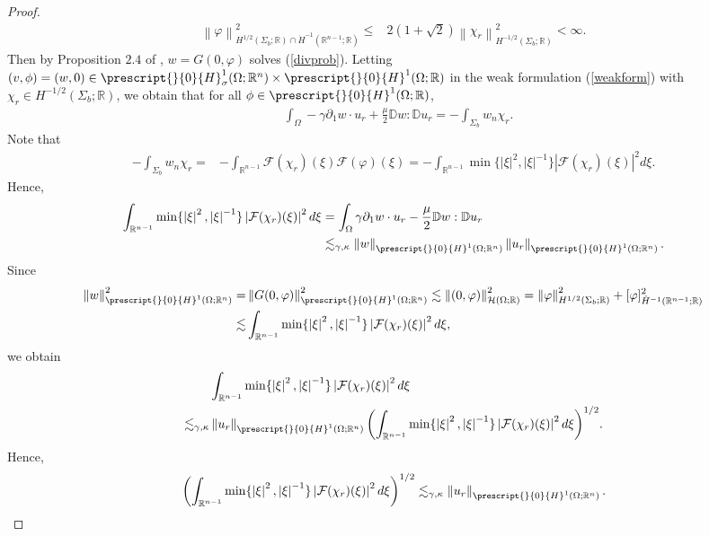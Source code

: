 \documentclass[11pt,letterpaper,reqno]{amsart}
\numberwithin{equation}{section}
\newcommand{\abs}[1]{\left\lvert#1\right\rvert}
\newcommand{\norm}[1]{\left\lVert#1\right\rVert}
\begin{document}
\begin{proof}
    \begin{align}
        \norm{\varphi}_{H^{1/2}(\Sigma_{b};\mathbb{R}) \cap \dot{H}^{-1}(\mathbb{R}^{n-1};\mathbb{R})}^{2} \leq& 2(1+\sqrt{2})\norm{\chi_{r}}_{H^{-1/2}(\Sigma_{b};\mathbb{R})}^{2}<\infty.
    \end{align}
    Then by Proposition \(2.4\) of \cite{MR4337506}, \(w=G(0,\varphi)\) solves (\ref{divprob}). Letting \((v,\phi)=(w,0) \in \prescript{}{0}{H}^{1}_{\sigma}(\Omega;\mathbb{R}^{n}) \times \prescript{}{0}{H}^{1}(\Omega;\mathbb{R})\) in the weak formulation (\ref{weakform}) with \(\chi_{r} \in H^{-1/2}(\Sigma_{b};\mathbb{R})\), we obtain that for all \(\phi \in \prescript{}{0}{H}^{1}(\Omega;\mathbb{R})\),
    \begin{align} \label{weakform2}
        &\int_{\Omega}-\gamma\partial_{1}w\cdot u_{r} +\frac{\mu}{2}\mathbb{D}w:\mathbb{D}u_{r} =-\int_{\Sigma_{b}}w_{n}\chi_{r}.
    \end{align}
    Note that
    \begin{align}
        -\int_{\Sigma_{b}}w_{n}\chi_{r} =& -\int_{\mathbb{R}^{n-1}}\mathcal{F}(\chi_{r})(\xi)\mathcal{F}(\varphi)(\xi) =-\int_{\mathbb{R}^{n-1}}\min\{\abs{\xi}^{2},\abs{\xi}^{-1}\}\abs{\mathcal{F}(\chi_{r})(\xi)}^{2}d\xi.
    \end{align}
    Hence,
    \begin{align}
        \int_{\mathbb{R}^{n-1}}\min\{\abs{\xi}^{2},\abs{\xi}^{-1}\}\abs{\mathcal{F}(\chi_{r})(\xi)}^{2}d\xi &=\int_{\Omega}\gamma\partial_{1}w\cdot u_{r} -\frac{\mu}{2}\mathbb{D}w:\mathbb{D}u_{r} \nonumber \\
        &\lesssim_{\gamma,\kappa} \norm{w}_{\prescript{}{0}{H}^{1}(\Omega;\mathbb{R}^{n})}\norm{u_{r}}_{\prescript{}{0}{H}^{1}(\Omega;\mathbb{R}^{n})}.
    \end{align}
    Since
    \begin{align}
        \norm{w}_{\prescript{}{0}{H}^{1}(\Omega;\mathbb{R}^{n})}^{2}=&\norm{G(0,\varphi)}_{\prescript{}{0}{H}^{1}(\Omega;\mathbb{R}^{n})}^{2} \lesssim \norm{(0,\varphi)}_{\mathcal{H}(\Omega;\mathbb{R})}^{2} =\norm{\varphi}_{H^{1/2}(\Sigma_{b};\mathbb{R})}^{2}+[\varphi]_{\dot{H}^{-1}(\mathbb{R}^{n-1};\mathbb{R})}^{2} \nonumber\\
        \lesssim& \int_{\mathbb{R}^{n-1}}\min\{\abs{\xi}^{2},\abs{\xi}^{-1}\}\abs{\mathcal{F}(\chi_{r})(\xi)}^{2}d\xi,
    \end{align}
    we obtain
    \begin{align}
        &\int_{\mathbb{R}^{n-1}}\min\{\abs{\xi}^{2},\abs{\xi}^{-1}\}\abs{\mathcal{F}(\chi_{r})(\xi)}^{2}d\xi \nonumber\\
        \lesssim_{\gamma,\kappa} &\norm{u_{r}}_{\prescript{}{0}{H}^{1}(\Omega;\mathbb{R}^{n})}\biggl(\int_{\mathbb{R}^{n-1}}\min\{\abs{\xi}^{2},\abs{\xi}^{-1}\}\abs{\mathcal{F}(\chi_{r})(\xi)}^{2}d\xi\biggr)^{1/2}.
    \end{align}
    Hence,
    \begin{align}
        \biggl(\int_{\mathbb{R}^{n-1}}\min\{\abs{\xi}^{2},\abs{\xi}^{-1}\}\abs{\mathcal{F}(\chi_{r})(\xi)}^{2}d\xi\biggr)^{1/2} \lesssim_{\gamma,\kappa} \norm{u_{r}}_{\prescript{}{0}{H}^{1}(\Omega;\mathbb{R}^{n})}.
    \end{align}
\end{proof}
\end{document}
